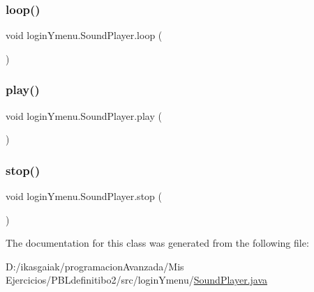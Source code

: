\subsubsection{\texorpdfstring{loop()}{loop()}}
{\footnotesize\ttfamily void login\+Ymenu.\+Sound\+Player.\+loop (\begin{DoxyParamCaption}{ }\end{DoxyParamCaption})}

\mbox{\label{classlogin_ymenu_1_1_sound_player_a5bc8659da139abc134dae848beac2310}} 
\subsubsection{\texorpdfstring{play()}{play()}}
{\footnotesize\ttfamily void login\+Ymenu.\+Sound\+Player.\+play (\begin{DoxyParamCaption}{ }\end{DoxyParamCaption})}

\mbox{\label{classlogin_ymenu_1_1_sound_player_a700b4ad6ca0cef8a4598e7164a9c58ff}} 
\subsubsection{\texorpdfstring{stop()}{stop()}}
{\footnotesize\ttfamily void login\+Ymenu.\+Sound\+Player.\+stop (\begin{DoxyParamCaption}{ }\end{DoxyParamCaption})}



The documentation for this class was generated from the following file\+:\begin{DoxyCompactItemize}
\item 
D\+:/ikasgaiak/programacion\+Avanzada/\+Mis Ejercicios/\+P\+B\+Ldefinitibo2/src/login\+Ymenu/\mbox{\hyperlink{_sound_player_8java}{Sound\+Player.\+java}}\end{DoxyCompactItemize}
